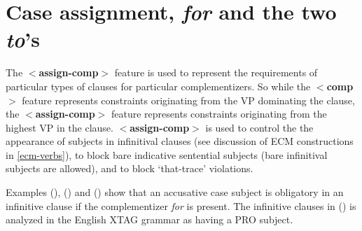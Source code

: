 
\section{Case assignment, {\it for\/} and the two {\it to\/}'s}
\label{for-complementizer}

The {\bf $<$assign-comp$>$} feature is used to represent the
requirements of particular types of clauses for particular
complementizers.  So while the {\bf $<$comp$>$} feature represents
constraints originating from the VP dominating the clause, the {\bf
$<$assign-comp$>$} feature represents constraints originating from the
highest VP in the clause. {\bf $<$assign-comp$>$} is used to control the
the appearance of subjects in infinitival clauses (see discussion of
ECM constructions in \ref{ecm-verbs}), to block bare indicative
sentential subjects (bare infinitival subjects are allowed), and to
block `that-trace' violations.

Examples (), () and () show that an accusative
case subject is obligatory in an infinitive clause if the
complementizer {\it for\/} is present. The infinitive clauses in
() is analyzed in the English XTAG grammar as
having a PRO subject.  


 
